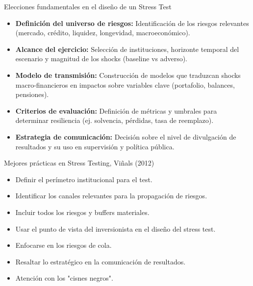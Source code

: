 \documentclass{beamer}
\begin{document}
\begin{frame}{Elecciones fundamentales en el diseño de un Stress Test}

\begin{itemize}

\item \textbf{Definición del universo de riesgos:}  
Identificación de los riesgos relevantes (mercado, crédito, liquidez, longevidad, macroeconómico).

\vspace{0.3cm}

\item \textbf{Alcance del ejercicio:}  
Selección de instituciones, horizonte temporal del escenario y magnitud de los shocks (baseline vs adverso).

\vspace{0.3cm}

\item \textbf{Modelo de transmisión:}  
Construcción de modelos que traduzcan shocks macro-financieros en impactos sobre variables clave (portafolio, balances, pensiones).

\vspace{0.3cm}

\item \textbf{Criterios de evaluación:}  
Definición de métricas y umbrales para determinar resiliencia (ej. solvencia, pérdidas, tasa de reemplazo).

\vspace{0.3cm}

\item \textbf{Estrategia de comunicación:}  
Decisión sobre el nivel de divulgación de resultados y su uso en supervisión y política pública.

\end{itemize}

\end{frame}
\begin{frame}{Mejores pr\'acticas en Stress Testing, Viñals (2012)}
\begin{itemize}
    \item Definir el per\'imetro institucional para el test.
    \item Identificar los canales relevantes para la propagaci\'on de riesgos.
    \item Incluir todos los riesgos y buffers materiales.
    \item Usar el punto de vista del inversionista en el diseño del stress test.
    \item Enfocarse en los riesgos de cola.
    \item Resaltar lo estrat\'egico en la comunicaci\'on de resultados.
    \item Atenci\'on con los "cisnes negros".
\end{itemize}
    
\end{frame}
\end{document}
